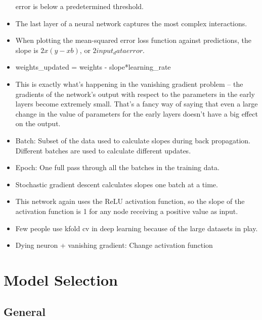 \documentclass[]{book}
\theoremstyle{definition}
\theoremstyle{definition}
\theoremstyle{definition}
\theoremstyle{remark}
\begin{document}
\begin{itemize}
  error is below a predetermined threshold.
\item
  The last layer of a neural network captures the most complex
  interactions.
\item
  When plotting the mean-squared error loss function against
  predictions, the slope is \(2x(y-xb)\), or \(2input_data error\).
\item
  weights\_updated = weights - slope*learning\_rate
\item
  This is exactly what's happening in the vanishing gradient problem --
  the gradients of the network's output with respect to the parameters
  in the early layers become extremely small. That's a fancy way of
  saying that even a large change in the value of parameters for the
  early layers doesn't have a big effect on the output.
\item
  Batch: Subset of the data used to calculate slopes during back
  propagation. Different batches are used to calculate different
  updates.
\item
  Epoch: One full pass through all the batches in the training data.
\item
  Stochastic gradient descent calculates slopes one batch at a time.
\item
  This network again uses the ReLU activation function, so the slope of
  the activation function is 1 for any node receiving a positive value
  as input.
\item
  Few people use kfold cv in deep learning because of the large datasets
  in play.
\item
  Dying neuron + vanishing gradient: Change activation function
\end{itemize}

\section{Model Selection}\label{model-selection}

\subsection{General}\label{general-3}
\end{document}
